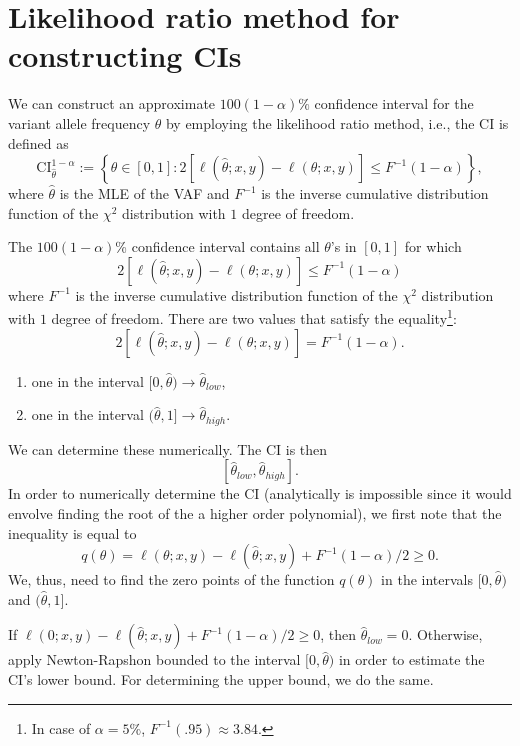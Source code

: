 \documentclass[a4paper,12pt]{article}
\begin{document}
\section*{Likelihood ratio method for constructing CIs}
We can construct an approximate $100(1 - \alpha)\%$ confidence interval for the variant allele frequency $\theta$ by employing the likelihood ratio method, i.e., the CI is defined as
\begin{equation}
 \text{CI}^{1-\alpha}_{\widehat{\theta}} := \left\{ \theta \in [0,1] : 2 \left[\ell(\widehat{\theta}; x, y) - \ell(\theta; x, y) \right] \leq F^{-1}(1 - \alpha) \right\}, 
\end{equation}
where $\widehat{\theta}$ is the MLE of the VAF and $F^{-1}$ is the inverse cumulative distribution function of the $\chi^2$ distribution with $1$ degree of freedom. 

The $100 (1 - \alpha)$\% confidence interval contains all $\theta$'s in $[0,1]$ for which 
\begin{equation}
 2 \left[\ell(\widehat{\theta}; x, y) - \ell(\theta; x, y) \right] \leq F^{-1}(1 - \alpha)
\end{equation}
where $F^{-1}$ is the inverse cumulative distribution function of the $\chi^2$ distribution with $1$ degree of freedom. There are two values that satisfy the equality\footnote{In case of $\alpha = 5\%$, $F^{-1}(.95) \approx 3.84$.}: 
$$
  2 \left[\ell(\widehat{\theta}; x, y) - \ell(\theta; x, y) \right] = F^{-1}(1 - \alpha).
$$
\begin{enumerate}
 \item one in the interval $[0, \widehat{\theta}) \rightarrow \widehat{\theta}_{low}$, 
 \item one in the interval $(\widehat{\theta}, 1] \rightarrow \widehat{\theta}_{high}$.
\end{enumerate}
We can determine these numerically. The CI is then 
$$
  [\widehat{\theta}_{low}, \widehat{\theta}_{high}]. 
$$
In order to numerically determine the CI (analytically is impossible since it would envolve finding the root of the a higher order polynomial), we first note that
the inequality is equal to
$$
  q(\theta) = \ell(\theta; x, y) - \ell(\widehat{\theta}; x, y) + F^{-1}(1 - \alpha) / 2 \geq 0. 
$$
We, thus, need to find the zero points of the function $q(\theta)$ in the intervals $[0, \widehat{\theta})$ and $(\widehat{\theta}, 1]$. 

If $\ell(0; x, y) - \ell(\widehat{\theta}; x, y) + F^{-1}(1 - \alpha) / 2 \geq 0$, then $\widehat{\theta}_{low} = 0$. Otherwise, apply Newton-Rapshon bounded to the interval $[0, \widehat{\theta})$ in order to estimate the CI's lower bound. For determining the upper bound, we do the same. 
\end{document}

